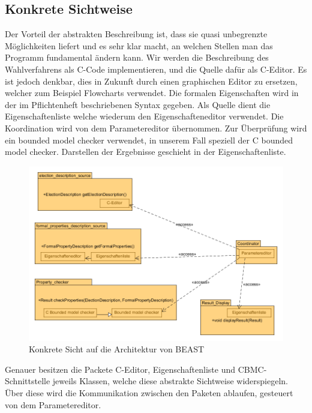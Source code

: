 \documentclass[a4paper]{scrreprt}
\begin{document}
\subsection{Konkrete Sichtweise} \label{concrete_section}
Der Vorteil der abstrakten Beschreibung ist, dass sie quasi unbegrenzte Möglichkeiten liefert und es sehr klar macht, an welchen Stellen man das Programm fundamental ändern kann. Wir werden die Beschreibung des Wahlverfahrens als C-Code implementieren, und die Quelle dafür als C-Editor. Es ist jedoch denkbar, dies in Zukunft durch einen graphischen Editor zu ersetzen, welcher zum Beispiel Flowcharts verwendet. Die formalen Eigenschaften wird in der im Pflichtenheft beschriebenen Syntax gegeben. Als Quelle dient die Eigenschaftenliste welche wiederum den Eigenschafteneditor verwendet. Die Koordination wird von dem Parametereditor übernommen. Zur Überprüfung wird ein bounded model checker verwendet, in unserem Fall speziell der C bounded model checker. Darstellen der Ergebnisse geschieht in der Eigenschaftenliste.  

\begin{figure}[H]
\includegraphics[scale=0.5]{highest-level-concrete-view.png}
\caption{Konkrete Sicht auf die Architektur von BEAST}
\label{concrete_view_of_beast_architecture}
\end{figure}

Genauer besitzen die Packete C-Editor, Eigenschaftenliste und CBMC-Schnittstelle jeweils Klassen, welche diese abstrakte Sichtweise widerspiegeln. Über diese wird die Kommunikation zwischen den Paketen ablaufen, gesteuert von dem Parametereditor.
\end{document}
